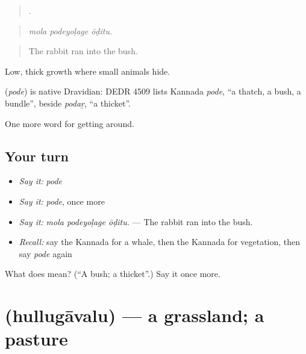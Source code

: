 \begin{quote}
  .
\end{quote}

\begin{quote}
\emph{mola podeyoḷage ōḍitu.}
\end{quote}

\begin{quote}
The rabbit ran into the bush.
\end{quote}

Low, thick growth where small animals hide.

\begin{cousinweb}
\textbf{} (\emph{pode}) is native Dravidian: DEDR 4509 lists Kannada \emph{pode}, \textquotedblleft{}a thatch, a bush, a bundle\textquotedblright{}, beside \emph{podaṟ}, \textquotedblleft{}a thicket\textquotedblright{}.
\end{cousinweb}

\begin{grammarlens}[title={What you've built}]
One more word for getting around.
\end{grammarlens}

\subsection*{Your turn}
\begin{itemize}
\raggedright
  \item \emph{Say it:} \emph{pode}
  \item \emph{Say it:} \emph{pode}, once more
  \item \emph{Say it:} \emph{mola podeyoḷage ōḍitu.} — The rabbit ran into the bush.
  \item \emph{Recall:} say the Kannada for a whale, then the Kannada for vegetation, then say \emph{pode} again
\end{itemize}

\begin{tcolorbox}[breakable,colback=teal!4,colframe=teal!35!black,title={Before you move on}]
What does  mean? (\textquotedblleft{}A bush; a thicket\textquotedblright{}.) Say it once more.
\end{tcolorbox}
\section[\texorpdfstring{\kn{ಹುಲ್ಲುಗಾವಲು} (hullugāvalu)}{ಹುಲ್ಲುಗಾವಲು (hullugāvalu)}]{ (hullugāvalu) — a grassland; a pasture}

